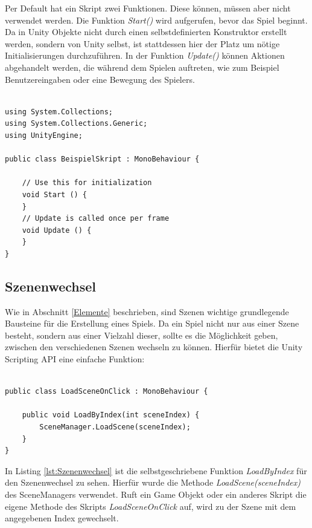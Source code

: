 Per Default hat ein Skript zwei Funktionen. Diese können, müssen aber nicht verwendet werden. Die Funktion \textit{Start()} wird aufgerufen, bevor das Spiel beginnt. Da in Unity Objekte nicht durch einen selbstdefinierten Konstruktor erstellt werden, sondern von Unity selbst, ist stattdessen hier der Platz um nötige Initialisierungen durchzuführen. In der Funktion \textit{Update()} können Aktionen abgehandelt werden, die während dem Spielen auftreten, wie zum Beispiel Benutzereingaben oder eine Bewegung des Spielers.

\lstset{style=sharpc}
\begin{lstlisting}[caption=Beispiel Skript, label=lst:BeispielSkript]

using System.Collections;
using System.Collections.Generic;
using UnityEngine;

public class BeispielSkript : MonoBehaviour {

	// Use this for initialization
	void Start () {		
	}	
	// Update is called once per frame
	void Update () {	
	}
}
\end{lstlisting}

\subsection{Szenenwechsel}
Wie in Abschnitt \ref{Elemente} beschrieben, sind Szenen wichtige grundlegende Bausteine für die Erstellung eines Spiels. Da ein Spiel nicht nur aus einer Szene besteht, sondern aus einer Vielzahl dieser, sollte es die Möglichkeit geben, zwischen den verschiedenen Szenen wechseln zu können. Hierfür bietet die Unity Scripting API eine einfache Funktion:

\lstset{style=sharpc}
\begin{lstlisting}[caption=Szenenwechsel, label=lst:Szenenwechsel]

public class LoadSceneOnClick : MonoBehaviour {
	
    public void LoadByIndex(int sceneIndex) {
        SceneManager.LoadScene(sceneIndex);
    }
}

\end{lstlisting}

In Listing \ref{lst:Szenenwechsel} ist die selbstgeschriebene Funktion \textit{LoadByIndex} für den Szenenwechsel zu sehen. Hierfür wurde die Methode \textit{LoadScene(sceneIndex)} des SceneManagers verwendet. Ruft ein Game Objekt oder ein anderes Skript die eigene Methode des Skripts \textit{LoadSceneOnClick} auf, wird zu der Szene mit dem angegebenen Index gewechselt. 

